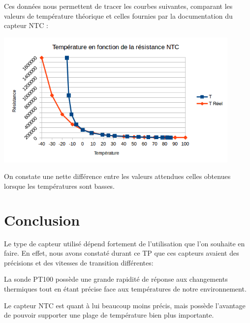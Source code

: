\documentclass[a4paper,12pt]{article}
\begin{document}
			\par Ces données nous permettent de tracer les courbes suivantes, comparant les valeurs de température théorique et celles fournies par la documentation du capteur NTC :
			\begin{center}
				\includegraphics[width=12cm]{../Images/GraphNTC.png}
			\end{center}
			\par On constate une nette différence entre les valeurs attendues celles obtenues lorsque les températures sont basses.

	\section{Conclusion}
	\label{sec:Conclusion}
		\par Le type de capteur utilisé dépend fortement de l'utilisation que l'on souhaite en faire.
		En effet, nous avons constaté durant ce TP que ces capteurs avaient des précisions et des vitesses de transition différentes:
		\par La sonde PT100 possède une grande rapidité de réponse aux changements thermiques tout en étant précise face aux températures de notre environnement.
		\par Le capteur NTC est quant à lui beaucoup moins précis, mais possède l'avantage de pouvoir supporter une plage de température bien plus importante.
\end{document}
